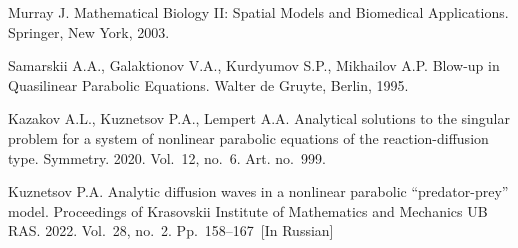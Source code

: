 \documentclass[12pt]{llncs}
\begin{document}
\begin{thebibliography}{9} 
 Murray J. Mathematical Biology II: Spatial Models and Biomedical Applications. Springer, New York, 2003.

 Samarskii A.A., Galaktionov V.A., Kurdyumov S.P., Mikhailov A.P. Blow-up in Quasilinear Parabolic Equations. Walter de Gruyte, Berlin, 1995.

 Kazakov A.L., Kuznetsov P.A., Lempert A.A. Analytical solutions to the singular problem for a system of nonlinear parabolic equations of the reaction-diffusion type. Symmetry. 2020. Vol.~12, no.~6. Art. no.~999. 

 Kuznetsov P.A. Analytic diffusion waves in a nonlinear parabolic ``predator-prey'' model. Proceedings of Krasovskii Institute of Mathematics and Mechanics UB RAS. 2022. Vol.~28, no.~2. Pp.~158--167~[In Russian]

\end{thebibliography}
\end{document}
